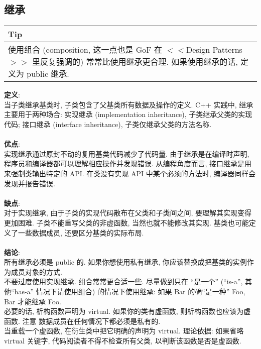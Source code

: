 \documentclass[a4paper,11pt,CJK]{article}
\begin{document}
\begin{CJK}{UTF8}{gbsn}
\subsection{继承}
\begin{table}[htbp]
\flushleft
\begin{tabular}{p{400pt}}
\toprule
\rowcolor[gray]{.8} Tip \\
\midrule
使用组合 (composition, 这一点也是 GoF 在 $<$$<$Design Patterns$>$$>$ 里反复强调的) 常常比使用继承更合理. 如果使用继承的话, 定义为 public 继承.\\
\bottomrule
\end{tabular}
\end{table}
\noindent
\textbf{定义}:\\
\indent 当子类继承基类时, 子类包含了父基类所有数据及操作的定义. C++ 实践中, 继承主要用于两种场合: 实现继承 (implementation inheritance), 子类继承父类的实现代码; 接口继承 (interface inheritance), 子类仅继承父类的方法名称.\\
\\
\textbf{优点}:\\
\indent 实现继承通过原封不动的复用基类代码减少了代码量. 由于继承是在编译时声明, 程序员和编译器都可以理解相应操作并发现错误. 从编程角度而言, 接口继承是用来强制类输出特定的 API. 在类没有实现 API 中某个必须的方法时, 编译器同样会发现并报告错误.\\
\\
\textbf{缺点}:\\
\indent 对于实现继承, 由于子类的实现代码散布在父类和子类间之间, 要理解其实现变得更加困难. 子类不能重写父类的非虚函数, 当然也就不能修改其实现. 基类也可能定义了一些数据成员, 还要区分基类的实际布局.\\
\\
\textbf{结论}:\\
\indent 所有继承必须是 public 的. 如果你想使用私有继承, 你应该替换成把基类的实例作为成员对象的方式.\\
\indent 不要过度使用实现继承. 组合常常更合适一些. 尽量做到只在 ``是一个'' (``is-a'',  其他``has-a'' 情况下请使用组合) 的情况下使用继承: 如果 Bar 的确``是一种'' Foo, Bar 才能继承 Foo.\\
\indent 必要的话, 析构函数声明为 virtual. 如果你的类有虚函数, 则析构函数也应该为虚函数. 注意 数据成员在任何情况下都必须是私有的.\\
\indent 当重载一个虚函数, 在衍生类中把它明确的声明为 virtual. 理论依据: 如果省略 virtual 关键字, 代码阅读者不得不检查所有父类, 以判断该函数是否是虚函数.\\
\\
\\

\end{CJK}
\end{document}

